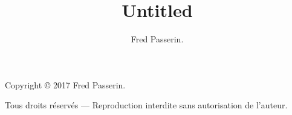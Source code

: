 \documentclass[ebook,oneside,draft]{memoir}
\title{Untitled}
\author{Fred Passerin.}
\date{}
\begin{document}
\maketitle


Copyright \copyright{} 2017 Fred Passerin.

\vspace{\baselineskip}
Tous droits réservés — Reproduction interdite sans autorisation de l'auteur.
\thispagestyle{empty}


%

\mainmatter



\backmatter

%
%

\tableofcontents
\end{document}
